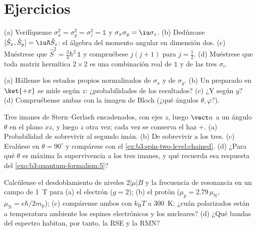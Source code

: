 \section{Ejercicios}

\begin{exercise}[$\star$]\label{exo:b3:spin-two-level:1}
(a) Verifíquense $\sigma_x^2 = \sigma_y^2 = \sigma_z^2 = \mathbb 1$ y
$\sigma_x\sigma_y = \iu\sigma_z$. (b) Dedúzcase $[\hat S_x, \hat S_y]
= \iu\hbar\hat S_z$: el álgebra del momento angular en dimensión dos.
(c) Muéstrese que $\hat S^2 = \tfrac34\hbar^2\,\mathbb 1$ y compruébese $j(j+1)$
para $j = \tfrac12$. (d) Muéstrese que toda matriz hermítica $2\times2$ es
una combinación real de $\mathbb 1$ y de las tres $\sigma_i$.
\end{exercise}

\begin{exercise}[$\star$]\label{exo:b3:spin-two-level:2}
(a) Hállense los estados propios normalizados de $\sigma_x$ y de $\sigma_y$.
(b) Un  preparado en $\ket{+x}$ se mide según $z$: ¿probabilidades de
los resultados? (c) ¿Y según $y$? (d) Compruébense ambas con la imagen de
Bloch (¿qué ángulos $\theta, \varphi$?).
\end{exercise}

\begin{exercise}[$\star$]\label{exo:b3:spin-two-level:3}
Tres imanes de Stern--Gerlach encadenados, con ejes $z$, luego $\vect n$ a
un ángulo $\theta$ en el plano $xz$, y luego $z$ otra vez; cada vez se
conserva el haz $+$. (a) Probabilidad de sobrevivir al segundo imán. (b)
De sobrevivir a los tres. (c) Evalúese en $\theta = 90^\circ$ y
compárese con el \cref{ex:b3:spin-two-level:chained}. (d) ¿Para qué
$\theta$ es máxima la supervivencia a los tres imanes, y qué recuerda esa
respuesta del \cref{exo:b3:quantum-formalism:5}?
\end{exercise}

\begin{exercise}[$\star$]\label{exo:b3:spin-two-level:4}
Calcúlense el desdoblamiento de niveles $2|\mu|B$ y la frecuencia de resonancia
en un campo de \qty{1}{T} para (a) el electrón ($g = 2$); (b) el
protón ($\mu_p = 2.79\,\mu_{\text{N}}$, $\mu_{\text{N}} =
e\hbar/2m_{\text{p}}$); (c) compárense ambos con $k_{\text{B}}T$ a
\qty{300}{K}: ¿cuán polarizados están a temperatura ambiente los espines
electrónicos y los nucleares? (d) ¿Qué bandas del espectro habitan, por
tanto, la RSE y la RMN?
\end{exercise}

